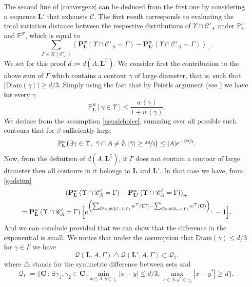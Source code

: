 \documentclass[10pt]{amsart}
\let\mathcal\mathscr
\newcommand{\sep}{\,:\,}
\numberwithin{equation}{section}
\theoremstyle{plain}
\theoremstyle{definition}
\newcommand{\Diam}{\mathrm{Diam}}
\newcommand{\cc}{\complement}
\newcommand{\cQ}{{\ensuremath{\mathcal Q}} }
\newcommand{\cC}{{\ensuremath{\mathcal C}} }
\newcommand{\cK}{{\ensuremath{\mathcal K}} }
\newcommand{\bP}{{\ensuremath{\mathbf P}} }
\newcommand{\bC}{{\ensuremath{\mathbf C}} }
\newcommand{\bL}{{\ensuremath{\mathbf L}} }
\newcommand{\bbP}{{\ensuremath{\mathbb P}} }
\newcommand{\gb}{\beta}
\newcommand{\gG}{\Gamma}
\begin{document}
The second line of \eqref{convergenz} can be deduced from the first one by considering a sequence $\bL'$ that exhausts $\cC$.
The first result corresponds to evaluating the total variation distance between the respective distributions of $\Upsilon\cap \cC'_A$ under
$\bbP^w_{\bL}$ and $\bbP^w$, which is equal to
\begin{equation*}
\sum_{\gG \in \cK(\cC'_A)} \left(\bP^w_{\bL}\left(\Upsilon \cap \cC'_A=\gG \right)- \bP^w_{\bL'}\left(\Upsilon \cap \cC'_A=\gG\right) \right)_+.
\end{equation*}
We set for this proof $d:=d(A,\bL^{\cc})$.
We consider first the contribution to the above sum of $\gG$ which contains a contour $\gamma$ of large diameter, that is, such that
$|\Diam(\gamma)|\ge d/3$.
Simply using the fact that by Peierls argument (see \eg \cite[Lem.\,4.4]{cf:part1}) we have for every $\gamma$
\begin{equation}\label{pignouf}
\bbP^{w}_{\bL}[\gamma \in \Upsilon]\le \frac{w(\gamma)}{1+w(\gamma)}.
\end{equation}
We deduce from the assumption \eqref{usualchoice}, summing over all possible such contours that for $\gb$ sufficiently large
\begin{equation*}
\bbP^w_{\bL}\bigl(\exists \gamma \in \Upsilon, \ \bar\gamma \cap A\ne \emptyset, |\tilde \gamma|\ge \sfrac{2d}{3}\bigr)\le
|A| e^{-\gb \sfrac{d}{2}}.
\end{equation*}
Now, from the definition of $d(A,\bL^{\cc})$, if $\gG$ does not contain a contour of large diameter then all contours in it belongs to $\bL$ and $\bL'$.
In that case we have, from \eqref{godstim}
\begin{multline*}
\left(\bP^w_{\bL}\left(\Upsilon \cap \cC'_A=\gG \right)- \bP^w_{\bL'}\left(\Upsilon \cap \cC'_A=\gG\right) \right)_+
\\= \bP^w_{\bL}\left(\Upsilon \cap \cC'_A=\gG \right) \Bigl[ e^{ \left(\sum_{\bC'\in \cQ(\bL',A,\gG)} w^T(\bC')-
\sum_{\bC \in \cQ(\bL,A,\gG)} w^T(\bC)\right)_+ }-1 \Bigr].
\end{multline*}
And we can conclude provided that we can show that the difference in the exponential is small.
We notice that under the assumption that $\Diam(\gamma)\le d/3$ for $\gamma\in \gG$ we have
\begin{equation*}
\cQ(\bL,A,\gG)\,\triangle\,\cQ(\bL',A,\gG)\subset \cQ_1.
\end{equation*}
where $\triangle$ stands for the symmetric difference between sets and
\begin{equation*}
\cQ_1:=\{ \bC \sep \exists \gamma_1,\gamma_2 \in \bC, \min_{x\in A, y\in \bar \gamma_1} |x-y|\le d/3, \max_{x\in A, y^*\in \gamma_2}|x-y^*|\ge d \},
\end{equation*}
\end{document}
